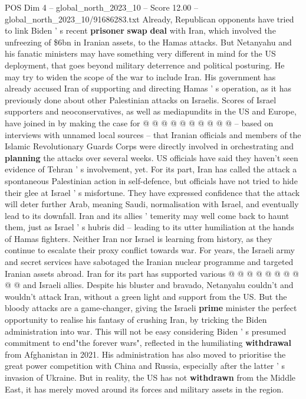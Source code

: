 \begin{textsample}{POS Dim 4 – global\_north\_2023\_10 – Score 12.00 – global\_north\_2023\_10/91686283.txt}
Already, Republican opponents have tried to link Biden ' s recent \textbf{prisoner} \textbf{swap} \textbf{deal} with Iran, which involved the unfreezing of \$6bn in Iranian assets, to the Hamas attacks.
But Netanyahu and his fanatic ministers may have something very different in mind for the US deployment, that goes beyond military deterrence and political posturing.
He may try to widen the scope of the war to include Iran.
His government has already accused Iran of supporting and directing Hamas ' s operation, as it has previously done about other Palestinian attacks on Israelis.
Scores of Israel supporters and neoconservatives, as well as mediapundits in the US and Europe, have joined in by making the case for @ @ @ @ @ @ @ @ @ @ -- based on interviews with unnamed local sources -- that Iranian officials and members of the Islamic Revolutionary Guards Corps were directly involved in orchestrating and \textbf{planning} the attacks over several weeks.
US officials have said they haven't seen evidence of Tehran ' s involvement, yet.
For its part, Iran has called the attack a spontaneous Palestinian action in self-defence, but officials have not tried to hide their glee at Israel ' s misfortune.
They have expressed confidence that the attack will deter further Arab, meaning Saudi, normalisation with Israel, and eventually lead to its downfall.
Iran and its allies ' temerity may well come back to haunt them, just as Israel ' s hubris did -- leading to its utter humiliation at the hands of Hamas fighters.
Neither Iran nor Israel is learning from history, as they continue to escalate their proxy conflict towards war.
For years, the Israeli army and secret services have sabotaged the Iranian nuclear programme and targeted Iranian assets abroad.
Iran for its part has supported various @ @ @ @ @ @ @ @ @ @ and Israeli allies.
Despite his bluster and bravado, Netanyahu couldn't and wouldn't attack Iran, without a green light and support from the US.
But the bloody attacks are a game-changer, giving the Israeli \textbf{prime} minister the perfect opportunity to realise his fantasy of crushing Iran, by tricking the Biden administration into war.
This will not be easy considering Biden ' s presumed commitment to end"the forever wars", reflected in the humiliating \textbf{withdrawal} from Afghanistan in 2021.
His administration has also moved to prioritise the great power competition with China and Russia, especially after the latter ' s invasion of Ukraine.
But in reality, the US has not \textbf{withdrawn} from the Middle East, it has merely moved around its forces and military assets in the region.

\end{textsample}
